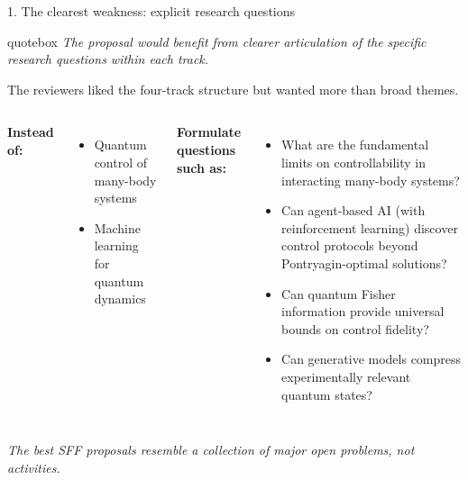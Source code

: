 \documentclass[10pt,aspectratio=169]{beamer}
\newcommand{\reviewerquote}[1]{%
  \begin{beamercolorbox}[sep=6pt,rounded=true,shadow=true]{quotebox}%
  \itshape #1%
  \end{beamercolorbox}%
}
\begin{document}
\begin{frame}{1. The clearest weakness: explicit research questions}
  \reviewerquote{The proposal would benefit from clearer articulation of the specific research questions within each track.}
  \vfill
  The reviewers liked the four-track structure but wanted more than broad themes.
  \vfill
  \begin{columns}[T]
    \textbf{Instead of:}
    \begin{itemize}
      \item Quantum control of many-body systems
      \item Machine learning for quantum dynamics
    \end{itemize}

    \textbf{Formulate questions such as:}
    \begin{itemize}\small
      \item What are the fundamental limits on controllability in interacting many-body systems?
      \item Can agent-based AI (with reinforcement learning) discover control protocols beyond Pontryagin-optimal solutions?
      \item Can quantum Fisher information provide universal bounds on control fidelity?
      \item Can generative models compress experimentally relevant quantum states?
    \end{itemize}
  \end{columns}
  \vfill
  \begin{center}
    \emph{The best SFF proposals resemble a collection of major open problems, not activities.}
  \end{center}
\end{frame}
\end{document}
